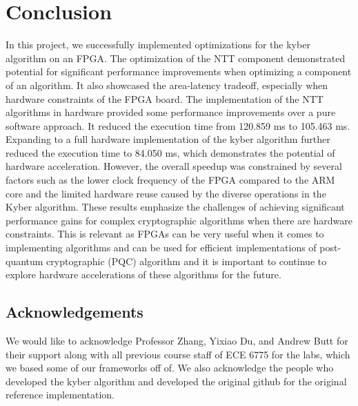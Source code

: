 
\section*{Conclusion}


In this project, we successfully implemented optimizations for the kyber algorithm on an FPGA. The optimization of the NTT component
demonstrated potential for significant performance improvements when optimizing a component of an algorithm. It also showcased 
the area-latency tradeoff, especially when hardware constraints of the FPGA board. The implementation of the NTT algorithms in hardware
provided some performance improvements over a pure software approach. It reduced the execution time from 120.859 ms to 105.463 ms. 
Expanding to a full hardware implementation of the kyber algorithm further reduced the execution time to 84.050 ms, which demonstrates
the potential of hardware acceleration. However, the overall speedup was constrained by several factors such as the lower clock
frequency of the FPGA compared to the ARM core and the limited hardware reuse caused by the diverse operations in the Kyber algorithm.
These results emphasize the challenges of achieving significant performance gains for complex cryptographic algorithms when there are
hardware constraints. This is relevant as FPGAs can be very useful when it comes to implementing algorithms and can be used for efficient 
implementations of post-quantum cryptographic (PQC) algorithm and it is important to continue to explore hardware accelerations of these
algorithms for the future.


\subsection*{Acknowledgements}

We would like to acknowledge Professor Zhang, Yixiao Du, and Andrew Butt for their support along with all previous course staff of ECE 6775 for 
the labs, which we based some of our frameworks off of. We also acknowledge the people who developed the kyber algorithm and developed the original
github for the original reference implementation.
